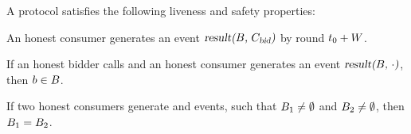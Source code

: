 \noindent
A \bidsettm protocol satisfies the following liveness and safety properties:
\begin{description}[leftmargin=4mm, labelindent=4mm]
    \item[(Liveness) Termination within \parAuctionTerm:]
    An honest consumer generates an event $\textsl{result(\ensuremath{B}, \ensuremath{C_\text{bid}})}$ by round $t_0 + W$.

    \item [(Safety) Censorship resistance:]
    If an honest bidder calls \opSubmitBid{\bid}
    and an honest consumer generates an event $\textsl{result(\ensuremath{B}, $\cdot$)}$,
    then $b \in B$.

    \item[(Safety) Weak consistency:]
    If two honest consumers generate  and  events, such that $B_1 \neq \emptyset$ and $B_2 \neq \emptyset$, then $B_1 = B_2$.

\end{description}






